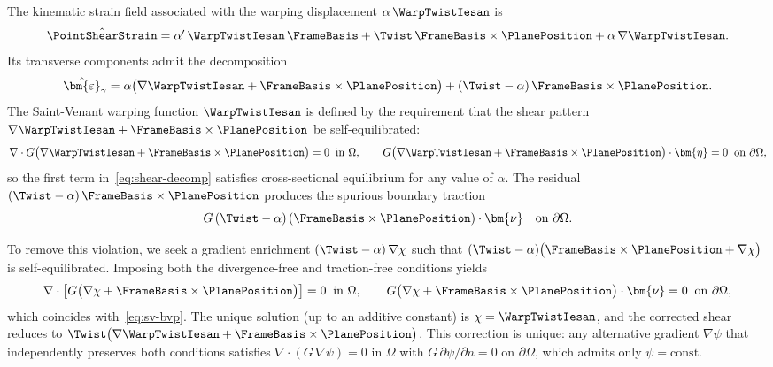 \iffalse
\begin{Note}
The kinematic strain field associated with the warping displacement $\alpha\,\WarpTwistIesan$ is
\begin{equation}
  \hat{\PointShearStrain} = \alpha'\,\WarpTwistIesan\,\FrameBasis
  + \Twist\,\FrameBasis\times\PlanePosition
  + \alpha\,\nabla\WarpTwistIesan.
  \label{eq:kinematic-strain}
\end{equation}
Its transverse components admit the decomposition
\begin{equation}
  \hat{\bm{\varepsilon}}_{\gamma} = \alpha\bigl(\nabla\WarpTwistIesan + \FrameBasis\times\PlanePosition\bigr)
  + (\Twist - \alpha)\,\FrameBasis\times\PlanePosition.
  \label{eq:shear-decomp}
\end{equation}
The Saint-Venant warping function $\WarpTwistIesan$ is defined by the requirement that the
shear pattern $\nabla\WarpTwistIesan + \FrameBasis\times\PlanePosition$ be self-equilibrated:
\begin{equation}
  \nabla\cdot G\bigl(\nabla\WarpTwistIesan
  + \FrameBasis\times\PlanePosition\bigr)  = 0
  \;\;\text{in }\Omega, \qquad
  G\bigl(\nabla\WarpTwistIesan
  + \FrameBasis\times\PlanePosition\bigr)\cdot\bm{\eta} = 0
  \;\;\text{on }\partial\Omega,
  \label{eq:sv-bvp}
\end{equation}
so the first term in~\eqref{eq:shear-decomp} satisfies cross-sectional equilibrium
for any value of $\alpha$. The residual
$(\Twist - \alpha)\,\FrameBasis\times\PlanePosition$ produces the
spurious boundary traction
\begin{equation}
  G\,(\Twist - \alpha)\,
  (\FrameBasis\times\PlanePosition)\cdot\bm{\nu}
  \quad\text{on }\partial\Omega.
  \label{eq:torsion-violation}
\end{equation}

To remove this violation, we seek a gradient enrichment
$(\Twist - \alpha)\,\nabla\chi$ such that
$(\Twist - \alpha)\bigl(\FrameBasis\times\PlanePosition + \nabla\chi\bigr)$ is
self-equilibrated. Imposing both the divergence-free and traction-free conditions
yields
\begin{equation}
  \nabla\cdot\bigl[G\bigl(\nabla\chi
  + \FrameBasis\times\PlanePosition\bigr)\bigr] = 0
  \;\;\text{in }\Omega, \qquad
  G\bigl(\nabla\chi
  + \FrameBasis\times\PlanePosition\bigr)\cdot\bm{\nu} = 0
  \;\;\text{on }\partial\Omega,
  \label{eq:chi-bvp}
\end{equation}
which coincides with~\eqref{eq:sv-bvp}. The unique solution (up to an additive
constant) is $\chi = \WarpTwistIesan$, and the corrected shear reduces to
$\Twist\bigl(\nabla\WarpTwistIesan + \FrameBasis\times\PlanePosition\bigr)$. This
correction is unique: any alternative gradient $\nabla\psi$ that independently
preserves both conditions satisfies
$\nabla\cdot(G\,\nabla\psi) = 0$ in $\Omega$ with
$G\,\partial\psi/\partial n = 0$ on $\partial\Omega$, which admits only
$\psi = \mathrm{const}$.


\end{Note}
